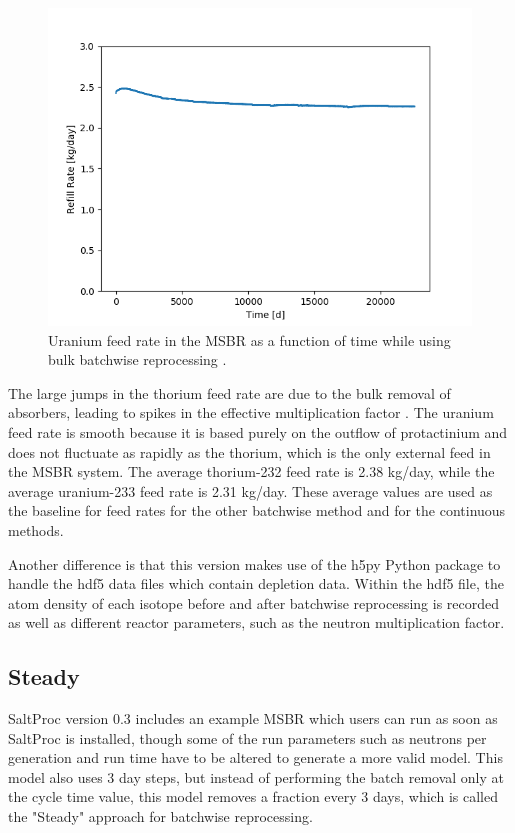 \begin{figure}[H]
  \centering
  \includegraphics[scale=0.5]{images/Pa233rem_massv01.png}
  \caption{Uranium feed rate in the MSBR as a function of time while using bulk batchwise reprocessing \cite{rykhlevskii_advanced_2018}.}
   \label{fig:U-feed-v1}
\end{figure}

The large jumps in the thorium feed rate are due to the bulk removal of absorbers, leading to spikes in the effective multiplication factor \cite{rykhlevskii_advanced_2018}. The uranium feed rate is smooth because it is based purely on the outflow of protactinium and does not fluctuate as rapidly as the thorium, which is the only external feed in the MSBR system. The average thorium-232 feed rate is 2.38 kg/day, while the average uranium-233 feed rate is 2.31 kg/day. These average values are used as the baseline for feed rates for the other batchwise method and for the continuous methods.

Another difference is that this version makes use of the h5py Python package to handle the hdf5 data files which contain depletion data. Within the hdf5 file, the atom density of each isotope before and after batchwise reprocessing is recorded as well as different reactor parameters, such as the neutron multiplication factor.

\subsection{Steady}

SaltProc version 0.3 includes an example MSBR which users can run as soon as SaltProc is installed, though some of the run parameters such as neutrons per generation and run time have to be altered to generate a more valid model. This model also uses 3 day steps, but instead of performing the batch removal only at the cycle time value, this model removes a fraction every 3 days, which is called the "Steady" approach for batchwise reprocessing.


